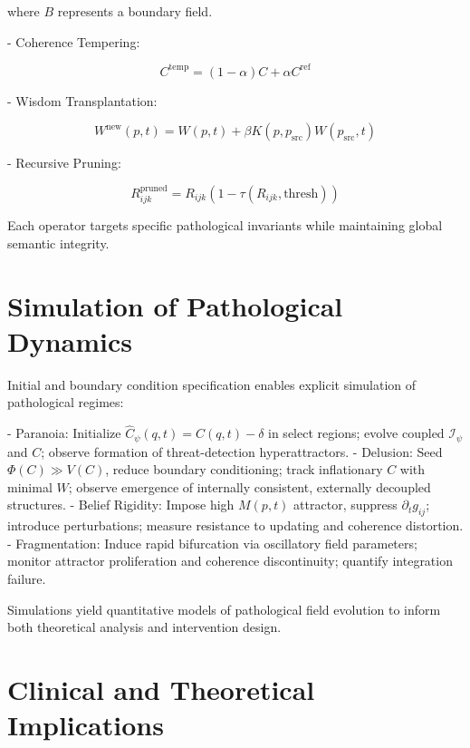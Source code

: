 where $B$ represents a boundary field.

- Coherence Tempering:

\begin{equation}
C^{\text{temp}} = (1-\alpha)C + \alpha C^{\text{ref}}
\end{equation}

- Wisdom Transplantation:

\begin{equation}
W^{\text{new}}(p,t) = W(p,t) + \beta K(p,p_{\text{src}}) W(p_{\text{src}},t)
\end{equation}

- Recursive Pruning:

\begin{equation}
R_{ijk}^{\text{pruned}} = R_{ijk} (1 - \tau(R_{ijk}, \text{thresh}))
\end{equation}

Each operator targets specific pathological invariants while maintaining global semantic integrity.

\section{Simulation of Pathological Dynamics}

Initial and boundary condition specification enables explicit simulation of pathological regimes:

- Paranoia: Initialize $\hat{C}_{\psi}(q,t) = C(q,t) - \delta$ in select regions; evolve coupled $\mathcal{I}_{\psi}$ and $C$; observe formation of threat-detection hyperattractors.
- Delusion: Seed $\Phi(C) \gg V(C)$, reduce boundary conditioning; track inflationary $C$ with minimal $W$; observe emergence of internally consistent, externally decoupled structures.
- Belief Rigidity: Impose high $M(p,t)$ attractor, suppress $\partial_t g_{ij}$; introduce perturbations; measure resistance to updating and coherence distortion.
- Fragmentation: Induce rapid bifurcation via oscillatory field parameters; monitor attractor proliferation and coherence discontinuity; quantify integration failure.

Simulations yield quantitative models of pathological field evolution to inform both theoretical analysis and intervention design.

\section{Clinical and Theoretical Implications}

